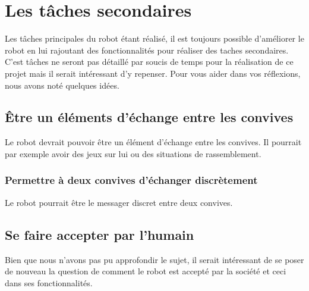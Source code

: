 \section{Les tâches secondaires}

Les tâches principales du robot étant réalisé, il est toujours possible d’améliorer le robot en lui rajoutant des fonctionnalités pour réaliser des taches secondaires. C’est tâches ne seront pas détaillé par soucis de temps pour la réalisation de ce projet mais il serait intéressant d’y repenser. Pour vous aider dans vos réflexions, nous avons noté quelques idées.

\subsection{\^Etre un éléments d'échange entre les convives}

Le robot devrait pouvoir être un élément d’échange entre les convives. Il pourrait par exemple avoir des jeux sur lui ou des situations de rassemblement.

\subsubsection{Permettre à deux convives d'échanger discrètement}

Le robot pourrait être le messager discret entre deux convives.

\subsection{Se faire accepter par l'humain} 

Bien que nous n’avons pas pu approfondir le sujet, il serait intéressant de se poser de nouveau la question de comment le robot est accepté par la société et ceci dans ses fonctionnalités.